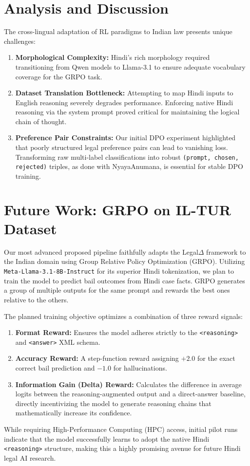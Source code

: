 \documentclass[conference]{IEEEtran}
\begin{document}
\section{Analysis and Discussion}
The cross-lingual adaptation of RL paradigms to Indian law presents unique challenges:
\begin{enumerate}
    \item \textbf{Morphological Complexity:} Hindi's rich morphology required transitioning from Qwen models to Llama-3.1 to ensure adequate vocabulary coverage for the GRPO task.
    \item \textbf{Dataset Translation Bottleneck:} Attempting to map Hindi inputs to English reasoning severely degrades performance. Enforcing native Hindi reasoning via the system prompt proved critical for maintaining the logical chain of thought.
    \item \textbf{Preference Pair Constraints:} Our initial DPO experiment highlighted that poorly structured legal preference pairs can lead to vanishing loss. Transforming raw multi-label classifications into robust \texttt{(prompt, chosen, rejected)} triples, as done with NyayaAnumana, is essential for stable DPO training.
\end{enumerate}

\section{Future Work: GRPO on IL-TUR Dataset}
Our most advanced proposed pipeline faithfully adapts the Legal$\Delta$ framework to the Indian domain using Group Relative Policy Optimization (GRPO). Utilizing \texttt{Meta-Llama-3.1-8B-Instruct} for its superior Hindi tokenization, we plan to train the model to predict bail outcomes from Hindi case facts. GRPO generates a group of multiple outputs for the same prompt and rewards the best ones relative to the others. 

The planned training objective optimizes a combination of three reward signals:
\begin{enumerate}
    \item \textbf{Format Reward:} Ensures the model adheres strictly to the \texttt{<reasoning>} and \texttt{<answer>} XML schema.
    \item \textbf{Accuracy Reward:} A step-function reward assigning $+2.0$ for the exact correct bail prediction and $-1.0$ for hallucinations.
    \item \textbf{Information Gain (Delta) Reward:} Calculates the difference in average logits between the reasoning-augmented output and a direct-answer baseline, directly incentivizing the model to generate reasoning chains that mathematically increase its confidence.
\end{enumerate}
While requiring High-Performance Computing (HPC) access, initial pilot runs indicate that the model successfully learns to adopt the native Hindi \texttt{<reasoning>} structure, making this a highly promising avenue for future Hindi legal AI research.
\end{document}
